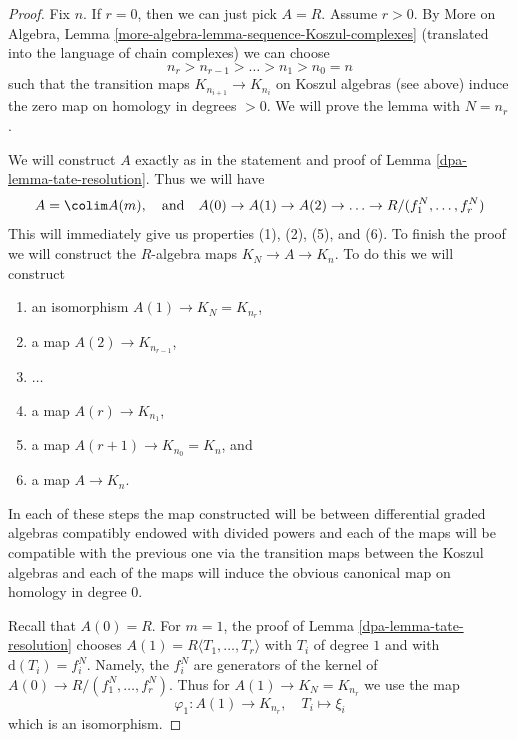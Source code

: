 \begin{proof}

Fix $n$. If $r = 0$, then we can just pick $A = R$. Assume $r > 0$. By
More on Algebra, Lemma \ref{more-algebra-lemma-sequence-Koszul-complexes}
(translated into the language of chain complexes) we can choose
$$
n_{r} > n_{r - 1} > \ldots > n_1 > n_0 = n
$$
such that the transition maps $K_{n_{i + 1}} \to K_{n_i}$ on Koszul
algebras (see above) induce the zero map on homology in degrees $> 0$.
We will prove the lemma with $N = n_r$.

\medskip\noindent
We will construct $A$ exactly as in the statement and proof of
Lemma \ref{dpa-lemma-tate-resolution}. Thus we will have
$$
A = \colim A(m),\quad\text{and}\quad
A(0) \to A(1) \to A(2) \to \ldots \to R/(f_1^N, \ldots, f_r^N)
$$
This will immediately give us properties (1), (2), (5), and (6).
To finish the proof we will construct the $R$-algebra maps
$K_N \to A \to K_n$. To do this we will construct
\begin{enumerate}
\item an isomorphism $A(1) \to K_N = K_{n_r}$,
\item a map $A(2) \to K_{n_{r - 1}}$,
\item $\ldots$
\item a map $A(r) \to K_{n_1}$,
\item a map $A(r + 1) \to K_{n_0} = K_n$, and
\item a map $A \to K_n$.
\end{enumerate}
In each of these steps the map constructed will be between
differential graded algebras compatibly endowed with divided powers
and each of the maps will be compatible with the
previous one via the transition maps between the Koszul algebras
and each of the maps will induce the obvious canonical map
on homology in degree $0$.

\medskip\noindent
Recall that $A(0) = R$. For $m = 1$, the proof of
Lemma \ref{dpa-lemma-tate-resolution}
chooses $A(1) = R\langle T_1, \ldots, T_r\rangle$ with
$T_i$ of degree $1$ and with $\text{d}(T_i) = f_i^N$.
Namely, the $f_i^N$ are generators of the kernel of
$A(0) \to R/(f_1^N, \ldots, f_r^N)$.
Thus for $A(1) \to K_N = K_{n_r}$ we use the map
$$
\varphi_1 : A(1) \longrightarrow K_{n_r},\quad T_i \longmapsto \xi_i
$$
which is an isomorphism.


\end{proof}
